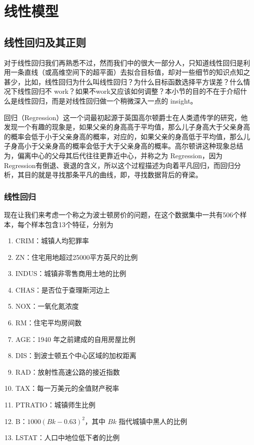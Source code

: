 \chapter{线性模型} %
\label{cha:线性模型}

\section{线性回归及其正则} %
\label{sec:线性回归及其正则}
对于线性回归我们再熟悉不过，然而我们中的很大一部分人，只知道线性回归是利用一条直线（或高维空间下的超平面）去拟合目标值，却对一些细节的知识点知之甚少，比如，线性回归为什么叫线性回归？为什么目标函数选择平方误差？什么情况下线性回归不 work？如果不work又应该如何调整？本小节的目的不在于介绍什么是线性回归，而是对线性回归做一个稍微深入一点的 insight。

回归（Regression）这一个词最初起源于英国高尔顿爵士在人类遗传学的研究\cite{wiki.Regression_toward_the_mean}，他发现一个有趣的现象是，如果父亲的身高高于平均值，那么儿子身高大于父亲身高的概率会低于小于父亲身高的概率，对应的，如果父亲的身高低于平均值，那么儿子身高小于父亲身高的概率会低于大于父亲身高的概率。高尔顿讲这种现象总结为，偏离中心的父母其后代往往更靠近中心，并称之为 Regression，因为Regression有倒退、衰退的含义，所以这个过程描述为{\wei 向着平凡回归}，而回归分析，其目的就是寻找那条平凡的曲线，即，寻找数据背后的脊梁。


\subsection{线性回归} %
\label{sub:线性回归}

现在让我们来考虑一个称之为波士顿房价的问题\cite{harrison1978hedonic}，在这个数据集中一共有506个样本，每个样本包含13个特征，分别为
\begin{enumerate}
	\item CRIM：城镇人均犯罪率
    \item ZN：住宅用地超过25000平方英尺的比例
    \item INDUS：城镇非零售商用土地的比例
    \item CHAS：是否位于查理斯河边上
    \item NOX：一氧化氮浓度
    \item RM：住宅平均房间数
	\item AGE：1940 年之前建成的自用房屋比例
	\item DIS：到波士顿五个中心区域的加权距离
	\item RAD：放射性高速公路的接近指数
	\item TAX：每一万美元的全值财产税率
	\item PTRATIO：城镇师生比例
	\item B：$1000(Bk - 0.63)^ 2$，其中 $Bk$ 指代城镇中黑人的比例
	\item LSTAT：人口中地位低下者的比例
\end{enumerate}

